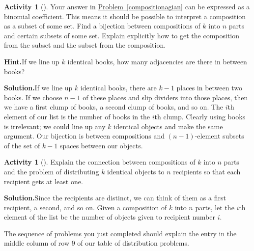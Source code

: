 \documentclass[10pt,]{book}
\theoremstyle{plain}
\theoremstyle{definition}
\newtheorem{activity}[project]{Activity}
\numberwithin{equation}{chapter}
\begin{document}
\begin{activity}[]\label{activity-121}
Your answer in \hyperref[compositionagian]{Problem~\ref{compositionagian}} can be expressed as a binomial coefficient. This means it should be possible to interpret a composition as a subset of some set. Find a bijection between compositions of \(k\) into \(n\) parts and certain subsets of some set.  Explain explicitly how to get the composition from the subset and the subset from the composition.%
\par\medskip\noindent%
\textbf{Hint.}\quad If we line up \(k\) identical books, how many adjacencies are there in between books?%
\par\medskip\noindent%
\textbf{Solution.}\quad If we line up \(k\) identical books, there are \(k-1\) places in between two books. If we choose \(n-1\) of these places and slip dividers into those places, then we have a first clump of books, a second clump of books, and so on. The \(i\)th element of our list is the number of books in the \(i\)th clump. Clearly using books is irrelevant; we could line up any \(k\) identical objects and make the same argument. Our bijection is between compositions and \((n-1)\)-element subsets of the set of \(k-1\) spaces between our objects.%
\end{activity}
\begin{activity}[]\label{activity-122}
Explain the connection between compositions of \(k\) into \(n\) parts and the problem of distributing \(k\) identical objects to \(n\) recipients so that each recipient gets at least one.%
\par\medskip\noindent%
\textbf{Solution.}\quad Since the recipients are distinct, we can think of them as a first recipient, a second, and so on. Given a composition of \(k\) into \(n\) parts, let the \(i\)th element of the list be the number of objects given to recipient number \(i\).%
\end{activity}
The sequence of problems you just completed should explain the entry in the middle column of row 9 of our table of distribution problems.%
\typeout{************************************************}
\typeout{************************************************}
\end{document}
